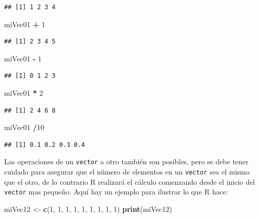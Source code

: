 \documentclass[]{book}
\newenvironment{Shaded}{\begin{snugshade}}{\end{snugshade}}
\newcommand{\KeywordTok}[1]{\textcolor[rgb]{0.13,0.29,0.53}{\textbf{#1}}}
\newcommand{\DecValTok}[1]{\textcolor[rgb]{0.00,0.00,0.81}{#1}}
\newcommand{\StringTok}[1]{\textcolor[rgb]{0.31,0.60,0.02}{#1}}
\newcommand{\OperatorTok}[1]{\textcolor[rgb]{0.81,0.36,0.00}{\textbf{#1}}}
\newcommand{\NormalTok}[1]{#1}
\begin{document}
\begin{verbatim}
## [1] 1 2 3 4
\end{verbatim}

\begin{Shaded}
\begin{Highlighting}[]
\NormalTok{miVec01 }\OperatorTok{+}\StringTok{ }\DecValTok{1}
\end{Highlighting}
\end{Shaded}

\begin{verbatim}
## [1] 2 3 4 5
\end{verbatim}

\begin{Shaded}
\begin{Highlighting}[]
\NormalTok{miVec01 }\OperatorTok{-}\StringTok{ }\DecValTok{1}
\end{Highlighting}
\end{Shaded}

\begin{verbatim}
## [1] 0 1 2 3
\end{verbatim}

\begin{Shaded}
\begin{Highlighting}[]
\NormalTok{miVec01 }\OperatorTok{*}\StringTok{ }\DecValTok{2}
\end{Highlighting}
\end{Shaded}

\begin{verbatim}
## [1] 2 4 6 8
\end{verbatim}

\begin{Shaded}
\begin{Highlighting}[]
\NormalTok{miVec01 }\OperatorTok{/}\DecValTok{10}
\end{Highlighting}
\end{Shaded}

\begin{verbatim}
## [1] 0.1 0.2 0.3 0.4
\end{verbatim}

Las operaciones de un \texttt{vector} a otro también son posibles, pero
se debe tener cuidado para asegurar que el número de elementos en un
\texttt{vector} sea el mismo que el otro, de lo contrario R realizará el
cálculo comenzando desde el inicio del \texttt{vector} mas pequeño. Aquí
hay un ejemplo para ilustrar lo que R hace:

\begin{Shaded}
\begin{Highlighting}[]
\NormalTok{miVec12 <-}\StringTok{ }\KeywordTok{c}\NormalTok{(}\DecValTok{1}\NormalTok{, }\DecValTok{1}\NormalTok{, }\DecValTok{1}\NormalTok{, }\DecValTok{1}\NormalTok{, }\DecValTok{1}\NormalTok{, }\DecValTok{1}\NormalTok{, }\DecValTok{1}\NormalTok{, }\DecValTok{1}\NormalTok{, }\DecValTok{1}\NormalTok{)}
\KeywordTok{print}\NormalTok{(miVec12)}
\end{Highlighting}
\end{Shaded}
\end{document}
